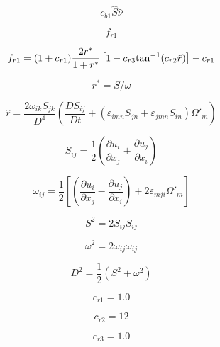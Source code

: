 

\begin{equation}
c_{b1} \hat S \hat \nu
\end{equation}

\begin{equation}
f_{r1}
\end{equation}

\begin{equation}
f_{r1} = (1 + c_{r1}) \frac{2r^*}{1+r^*}\left[ 1 - c_{r3} {\rm tan}^{-1}(c_{r2} \hat r)\right] - c_{r1}
\end{equation}

\begin{equation}
r^* = S/\omega
\end{equation}

\begin{equation}
\hat r = \frac{2 \omega_{ik} S_{jk}}{D^4} \left( \frac{DS_{ij}}{Dt} + (\varepsilon_{imn}S_{jn}
   +\varepsilon_{jmn}S_{in}) \Omega'_m \right)
\end{equation}

\begin{equation}
S_{ij} = \frac{1}{2} \left(\frac{\partial u_i}{\partial x_j} + 
   \frac{\partial u_j}{\partial x_i} \right)
\end{equation}

\begin{equation}
\omega_{ij} = \frac{1}{2} \left[ \left(\frac{\partial u_i}{\partial x_j} - 
   \frac{\partial u_j}{\partial x_i} \right) + 2 \varepsilon_{mji} \Omega'_m \right]
\end{equation}

\begin{equation}
S^2 = 2 S_{ij}S_{ij}
\end{equation}

\begin{equation}
\omega^2 = 2 \omega_{ij}\omega_{ij}
\end{equation}

\begin{equation}
D^2 = \frac{1}{2} \left(S^2 + \omega^2 \right)
\end{equation}

\begin{equation}
c_{r1} = 1.0
\end{equation}

\begin{equation}
c_{r2} = 12
\end{equation}

\begin{equation}
c_{r3} = 1.0
\end{equation}

